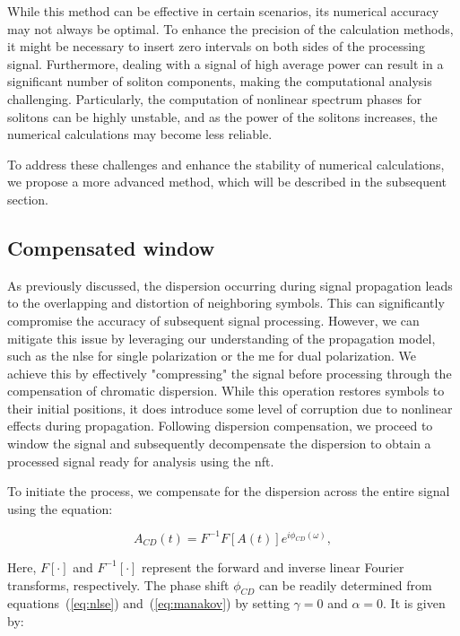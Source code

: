 While this method can be effective in certain scenarios, its numerical accuracy may not always be optimal. To enhance the precision of the calculation methods, it might be necessary to insert zero intervals on both sides of the processing signal. Furthermore, dealing with a signal of high average power can result in a significant number of soliton components, making the computational analysis challenging. Particularly, the computation of nonlinear spectrum phases for solitons can be highly unstable, and as the power of the solitons increases, the numerical calculations may become less reliable.

To address these challenges and enhance the stability of numerical calculations, we propose a more advanced method, which will be described in the subsequent section.

\subsection{Compensated window}

As previously discussed, the dispersion occurring during signal propagation leads to the overlapping and distortion of neighboring symbols. This can significantly compromise the accuracy of subsequent signal processing. However, we can mitigate this issue by leveraging our understanding of the propagation model, such as the \acrlong{nlse} for single polarization or the \acrlong{me} for dual polarization. We achieve this by effectively "compressing" the signal before processing through the compensation of chromatic dispersion. While this operation restores symbols to their initial positions, it does introduce some level of corruption due to nonlinear effects during propagation. Following dispersion compensation, we proceed to window the signal and subsequently decompensate the dispersion to obtain a processed signal ready for analysis using the \acrshort{nft}.

To initiate the process, we compensate for the dispersion across the entire signal using the equation:

\begin{equation}
A_{CD}(t) = F^{-1}F[A(t)]e^{i\phi_{CD}(\omega)} {,}
\end{equation}

Here, $F[\cdot]$ and $F^{-1}[\cdot]$ represent the forward and inverse linear Fourier transforms, respectively. The phase shift $\phi_{CD}$ can be readily determined from equations~(\ref{eq:nlse}) and~(\ref{eq:manakov}) by setting $\gamma = 0$ and $\alpha = 0$. It is given by:

